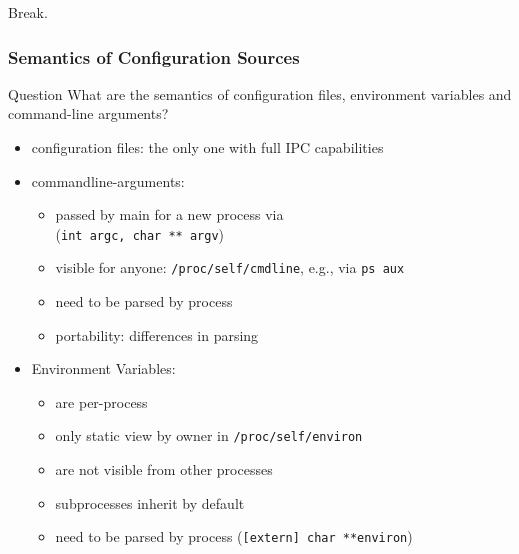 \begin{assignment}
	\begin{task}
	Break.
	\end{task}
\end{assignment}

\begin{frame}
	\frametitle{Semantics of Configuration Sources}
	\begin{alertblock}{Question}
	What are the semantics of configuration files, environment variables and command-line arguments?
	\end{alertblock}

	\pause
	\begin{itemize}
	\item configuration files: the only one with full IPC capabilities
	\item commandline-arguments:
	\begin{itemize}
	\item passed by main for a new process via \\ (\texttt{int argc, char ** argv})
	\item visible for anyone: \texttt{/proc/self/cmdline}, e.g., via \texttt{ps aux}
	\item need to be parsed by process
	\item portability: differences in parsing
	\end{itemize}

	\item Environment Variables:
	\begin{itemize}
	\item are per-process
	\item only static view by owner in \texttt{/proc/self/environ}
	\item are not visible from other processes
	\item subprocesses inherit by default
	\item need to be parsed by process (\texttt{[extern] char **environ}) %
	\end{itemize}
	\end{itemize}
\end{frame}

